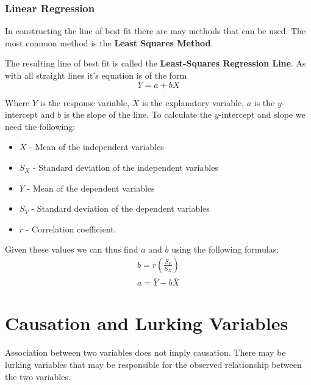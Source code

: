 \documentclass[12pt letter]{report}
\begin{document}
\pagebreak
\subsubsection{Linear Regression}



In constructing the line of best fit there are may methods that can be used. The most common method is the \textbf{Least
	Squares Method}.



The resulting line of best fit is called the \textbf{Least-Squares Regression Line}. As with all straight lines it's
equation is of the form
\[
	Y = a + bX
\]

Where $Y$ is the response variable, $X$ is the explanatory variable, $a$ is the $y$-intercept and $b$ is the slope of the line.
To calculate the $y$-intercept and slope we need the following:
\begin{itemize}
	\item $\overline{X}$ - Mean of the independent variables
	\item $S_{X}$ - Standard deviation of the independent variables
	\item $\overline{Y}$ - Mean of the dependent variables
	\item $S_{Y}$ - Standard deviation of the dependent variables
	\item $r$ - Correlation coefficient.
\end{itemize}

Given these values we can thus find $a$ and $b$ using the following formulas:
\begin{align*}
	b = r \left( \frac{S_{Y}}{S_{X}} \right) \\
	a = \overline{Y} - b \overline{X}
\end{align*}

\section{Causation and Lurking Variables}

Association between two variables does not imply causation. There may be lurking variables that may be responsible for the observed relationship between the two variables.

\end{document}
